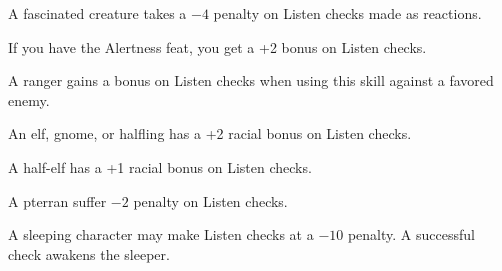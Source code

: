 A fascinated creature takes a $-4$ penalty on Listen checks made as reactions.

If you have the Alertness feat, you get a +2 bonus on Listen checks.

A ranger gains a bonus on Listen checks when using this skill against a favored enemy.

An elf, gnome, or halfling has a +2 racial bonus on Listen checks.

A half-elf has a +1 racial bonus on Listen checks.

A pterran suffer $-2$ penalty on Listen checks.

A sleeping character may make Listen checks at a $-10$ penalty. A successful check awakens the sleeper.